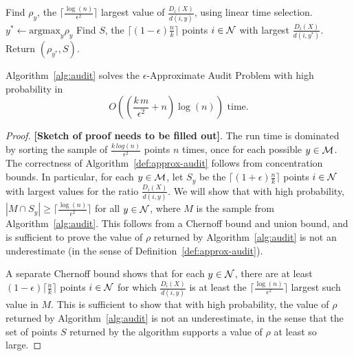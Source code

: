 \begin{algorithm}
\begin{algorithmic}[1]
\caption{Audit}
\label{alg:audit}
		\STATE Find $\rho_y$, the $\lceil \frac{\log(n)}{\epsilon^2} \rceil$ largest value of $\frac{D_i(X)}{d(i, y)}$, using linear time selection.
	\ENDFOR 
	\STATE $y^* \gets \mbox{argmax}_y \rho_y$
	\STATE Find $S$, the $\lceil (1-\epsilon) \frac{n}{k} \rceil$ points $i \in \mathcal {N}$ with largest $\frac{D_i(X)}{d(i, y^*)}$.
	\STATE Return $(\rho_{y^*}, S)$.
\end{algorithmic}
\end{algorithm}

\begin{theorem}
\label{thm:audit}
	Algorithm~\ref{alg:audit} solves the $\epsilon$-Approximate Audit Problem with high probability in $$O \left( \left( \frac{k \, m}{\epsilon^{2}} + n \right) \log(n) \right) \mbox{ time.}$$
\end{theorem}   
\begin{proof}
	\textbf{[Sketch of proof needs to be filled out]}. The run time is dominated by sorting the sample of $\frac{k \, log(n)}{\epsilon^2}$ points $n$ times, once for each possible $y \in \mathcal{M}$. The correctness of Algorithm~\ref{def:approx-audit} follows from concentration bounds. In particular, for each $y \in \mathcal{M}$, let $S_y$ be the $\lceil (1+\epsilon) \frac{n}{k} \rceil$ points $i \in \mathcal {N}$ with largest values for the ratio $\frac{D_i(X)}{d(i, y)}$. We will show that with high probability, $| M \cap S_y | \geq \lceil \frac{\log(n)}{\epsilon^2} \rceil$ for all $y \in \mathcal {N}$, where $M$ is the sample from Algorithm~\ref{alg:audit}. This follows from a Chernoff bound and union bound, and is sufficient to prove the value of $\rho$ returned by Algorithm~\ref{alg:audit} is not an underestimate (in the sense of Definition~\ref{def:approx-audit}). 
	
	A separate Chernoff bound shows that for each $y \in \mathcal {N}$, there are at least $(1-\epsilon) \lceil \frac{n}{k} \rceil$ points $i \in \mathcal {N}$ for which $\frac{D_i(X)}{d(i, y)}$ is at least the $\lceil \frac{\log(n)}{\epsilon^2} \rceil$ largest such value in $M$. This is sufficient to show that with high probability, the value of $\rho$ returned by Algorithm~\ref{alg:audit} is not an underestimate, in the sense that the set of points $S$ returned by the algorithm supports a value of $\rho$ at least so large.    
\end{proof}

\fi







